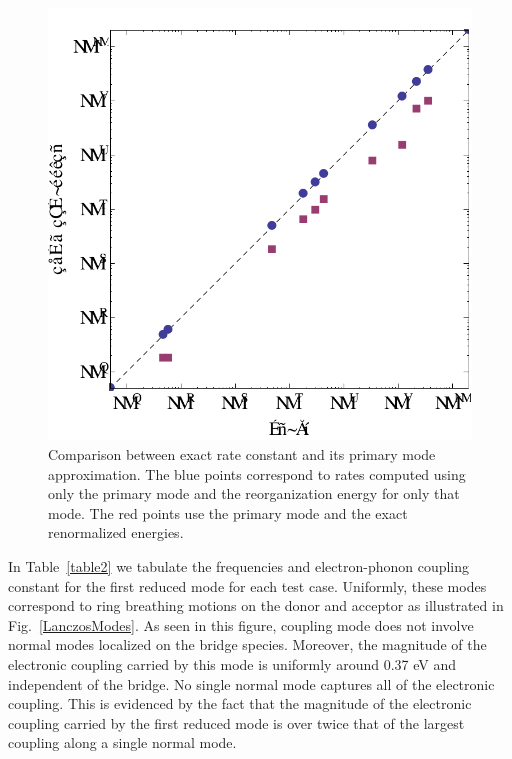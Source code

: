 \begin{figure}[t]
\includegraphics[width=\columnwidth]{Chapters/chap2/Figure6}
\caption{Comparison between exact rate constant and its primary mode approximation.  The blue points correspond to rates computed using
only the primary mode and the reorganization energy for only that mode.  The red points use the primary mode and the exact
renormalized energies. }\label{fig-1mode}
\end{figure}

In Table~\ref{table2} we tabulate the frequencies and electron-phonon coupling constant for the first reduced mode for each
test case.  Uniformly, these modes correspond to ring breathing motions on the donor and acceptor as illustrated in Fig.~\ref{LanczosModes}.
As seen in this figure, coupling mode does not involve normal modes localized on the bridge species.
Moreover, the magnitude of the electronic coupling carried by this mode is uniformly around 0.37 eV  and independent of the bridge.
No single normal mode captures all of the electronic coupling.  This is evidenced by the fact that the magnitude of the electronic coupling
carried by the first reduced mode is over twice that of the largest coupling along a single normal mode.




